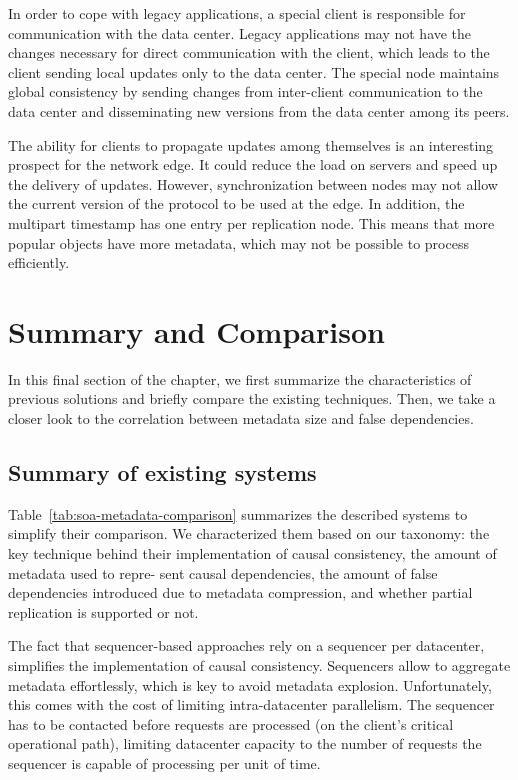 In order to cope with legacy applications, a special client is responsible for communication with the data center. Legacy applications may not have the changes necessary for direct communication with the client, which leads to the client sending local updates only to the data center. The special node maintains global consistency by sending changes from inter-client communication to the data center and disseminating new versions from the data center among its peers. 

The ability for clients to propagate updates among themselves is an interesting prospect for the network edge. It could reduce the load on servers and speed up the delivery of updates. However, synchronization between nodes may not allow the current version of the protocol to be used at the edge. In addition, the multipart timestamp has one entry per replication node. This means that more popular objects have more metadata, which may not be possible to process efficiently.

\section{Summary and Comparison}
\label{sec:soa:comparison}

In this final section of the chapter,
we first summarize the characteristics of previous solutions 
and briefly compare the existing techniques. 
Then, we take a closer look to the correlation between metadata size and 
false dependencies.

\subsection{Summary of existing systems}

Table~\ref{tab:soa-metadata-comparison} summarizes the described systems 
to simplify their comparison. 
We characterized them based on our taxonomy: 
the key technique behind their implementation of causal consistency, 
the amount of metadata used to repre- sent causal dependencies, 
the amount of false dependencies introduced due to metadata compression, 
and whether partial replication is supported or not.

The fact that sequencer-based approaches rely on a sequencer per datacenter, 
simplifies the implementation of causal consistency. 
Sequencers allow to aggregate metadata effortlessly, 
which is key to avoid metadata explosion. 
Unfortunately, this comes with the cost of limiting intra-datacenter parallelism. 
The sequencer has to be contacted before requests are processed 
(on the client’s critical operational path), 
limiting datacenter capacity to the number of requests the sequencer is 
capable of processing per unit of time.

